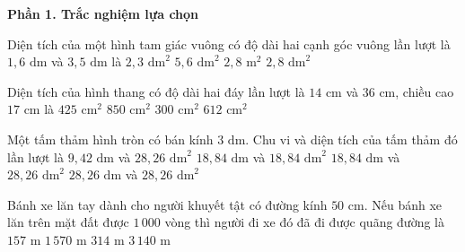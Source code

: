 \textbf{Phần 1. Trắc nghiệm lựa chọn}

\begin{ex} %
Diện tích của một hình tam giác vuông có độ dài hai cạnh góc vuông lần lượt là $1{,}6\text{ dm}$ và $3{,}5\text{ dm}$ là
\choice
{$2{,}3\text{ dm}^2$}
{$5{,}6\text{ dm}^2$}
{$2{,}8\text{ m}^2$}
{\True $2{,}8\text{ dm}^2$}
\end{ex}

\begin{ex} %
Diện tích của hình thang có độ dài hai đáy lần lượt là $14\text{ cm}$ và $36\text{ cm}$, chiều cao $17\text{ cm}$ là
\choice
{\True $425\text{ cm}^2$}
{$850\text{ cm}^2$}
{$300\text{ cm}^2$}
{$612\text{ cm}^2$}
\end{ex}

\begin{ex} %
Một tấm thảm hình tròn có bán kính $3\text{ dm}$. Chu vi và diện tích của tấm thảm đó lần lượt là
\choice
{$9{,}42\text{ dm}$ và $28{,}26\text{ dm}^2$}
{$18{,}84\text{ dm}$ và $18{,}84\text{ dm}^2$}
{\True $18{,}84\text{ dm}$ và $28{,}26\text{ dm}^2$}
{$28{,}26\text{ dm}$ và $28{,}26\text{ dm}^2$}
\end{ex}

\begin{ex} %
Bánh xe lăn tay dành cho người khuyết tật có đường kính $50\text{ cm}$. Nếu bánh xe lăn trên mặt đất được $1\,000$ vòng thì người đi xe đó đã đi được quãng đường là
\choice
{$157\text{ m}$}
{\True $1\,570\text{ m}$}
{$314\text{ m}$}
{$3\,140\text{ m}$}
\end{ex}

